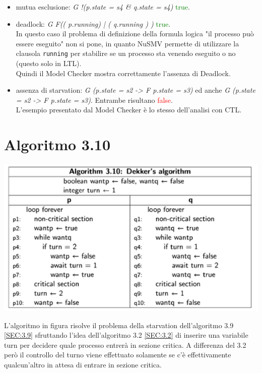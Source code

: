 \documentclass[a4paper]{article}
\begin{document}
\begin{itemize}
        \item mutua esclusione: \textit{G !(p.state = s4 \& q.state = s4)} \textcolor{green}{true}.
        \item deadlock: \textit{G F(( p.running) | ( q.running ) )} \textcolor{green}{true}. \\
		In questo caso il problema di definizione della formula logica "il processo può essere eseguito" non si pone, in quanto NuSMV permette di utilizzare la clausola \texttt{running} per stabilire se un processo sta venendo eseguito o no (questo solo in LTL).\\
		Quindi il Model Checker mostra correttamente l'assenza di Deadlock.
        \item assenza di starvation: \textit{G (p.state = s2 ->  F p.state = s3)} ed anche \textit{G (p.state = s2 ->  F p.state = s3)}. Entrambe risultano \textcolor{red}{false}.\\
		L'esempio presentato dal Model Checker è lo stesso dell'analisi con CTL.
\end{itemize}

\newpage
\section{Algoritmo 3.10}
\label{SEC:3.10}
\begin{center}\includegraphics[width=1\textwidth]{3.10.png}\end{center}
L'algoritmo in figura risolve il problema della starvation dell'algoritmo 3.9 \ref{SEC:3.9} sfruttando l'idea dell'algoritmo 3.2 \ref{SEC:3.2} di inserire una variabile turn per decidere quale processo entrerà in sezione critica.
A differenza del 3.2 però il controllo del turno viene effettuato solamente se c'è effettivamente qualcun'altro in attesa di entrare in sezione critica.\\
\end{document}
